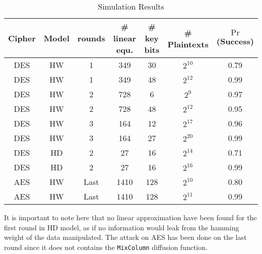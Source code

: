 \documentclass[11pt,a4paper]{article}
\begin{document}
{{{{{{{{{{\begin{table}[!h]
\begin{center}
\tiny{
\begin{tabular}{|c|c|c|c|c|c|c|}
\hline
Cipher & Model & rounds & \# linear equ. & \# key bits & \# Plaintexts & $\Pr$(Success) \\
\hline
\hline
DES    & HW    & 1      &  349           &  30         & $2^{10}$   & 0.79           \\
DES    & HW    & 1      &  349           &  48         & $2^{12}$   & 0.99           \\
\hline
DES    & HW    & 2      &  728           &   6         & $2^{9}$    & 0.97           \\
DES    & HW    & 2      &  728           &   48        & $2^{12}$   & 0.95           \\
\hline
DES    & HW    & 3      &  164           &   12        & $2^{17}$   & 0.96           \\
DES    & HW    & 3      &  164           &   27        & $2^{20}$   & 0.99           \\
\hline
DES    & HD    & 2      &  27            &  16         & $2^{14}$   & 0.71           \\
DES    & HD    & 2      &  27            &  16         & $2^{16}$   & 0.99           \\
\hline
AES    & HW    & Last   &  1410          &  128        & $2^{10}$   & 0.80           \\
AES    & HW    & Last   &  1410          &  128        & $2^{11}$   & 0.99           \\
\hline
\end{tabular}
\caption{Simulation Results}
\label{table:result_MLPA_simu}
}
\end{center}
\end{table}
It is important to note here that no linear approximation have been found for the first round in HD model, as if no information would leak from the hamming weight of the 
data manipulated. The attack on AES has been done on the last round since it does not contains the \texttt{MixColumn} diffusion function.
\vspace{1ex} \\
}}}}}}}}}}
\end{document}
